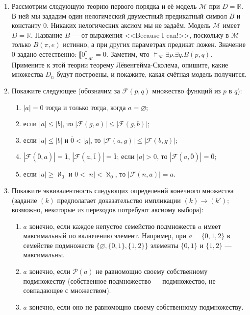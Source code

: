\documentclass[10pt,a4paper,oneside]{article}
\begin{document}
\begin{enumerate}
\item Рассмотрим следующую теорию первого порядка и её модель $\mathcal{M}$ при $D = \mathbb{R}$. В ней мы зададим один нелогический
двуместный предикатный символ $B$ и константу $0$. Никаких нелогических
аксиом мы не задаём. Модель $\mathcal{M}$ имеет $D = \mathbb{R}$.
Название $B$ --- от выражения <<Because I can!>>, поскольку в $\mathcal{M}$ только $B(\pi,e)$ истинно, а при других параметрах предикат ложен.
Значение 0 задано естественно: $\llbracket 0 \rrbracket_\mathcal{M} = 0$. Заметим, что $\models_\mathcal{M} \exists p.\exists q.B(p,q)$.
Примените к этой теории теорему Лёвенгейма-Сколема, опишите, какие множества $D_n$ будут построены, и покажите, 
какая счётная модель получится.
\item Покажите следующее (обозначим за $\mathcal{F}(p,q)$ множество функций из $p$ в $q$):
\begin{enumerate}
\item $|a|=0$ тогда и только тогда, когда $a = \varnothing$;
\item если $|a|\le|b|$, то $|\mathcal{F}(g,a)| \le |\mathcal{F}(g,b)|$;
\item если $|a|\le|b|$ и $\overline{0}<|g|$, то $|\mathcal{F}(a,g)| \le |\mathcal{F}(b,g)|$;
\item $|\mathcal{F}(\overline{0},a)| = \overline{1}$, $|\mathcal{F}(a,\overline{1})| = \overline{1}$; если $|a| > 0$, то $|\mathcal{F}(a,\overline{0})| = \overline{0}$;
\item если $|a|\ge\aleph_0$ и $0 < |n| < \aleph_0$, то $|\mathcal{F}(n,a)| = a$.
\end{enumerate}
\item Покажите эквивалентность следующих определений конечного множества (задание $(k)$ предполагает доказательство
импликации $(k)\rightarrow(k')$; возможно, некоторые из переходов потребуют аксиому выбора):
\begin{enumerate}
\item $a$ конечно, если каждое непустое семейство подмножеств $a$ имеет максимальный по включению элемент.
Например, при $a = \{0,1,2\}$ в семействе подмножеств $\{\varnothing,\{0,1\},\{1,2\}\}$ элементы $\{0,1\}$ и $\{1,2\}$ --- максимальны.
\item $a$ конечно, если $\mathcal{P}(a)$ не равномощно своему собственному подмножеству (собственное подмножество --- подмножество, не совпадающее с множеством).
\item $a$ конечно, если оно не равномощно своему собственному подмножеству.

\end{enumerate}
\end{enumerate}
\end{document}
